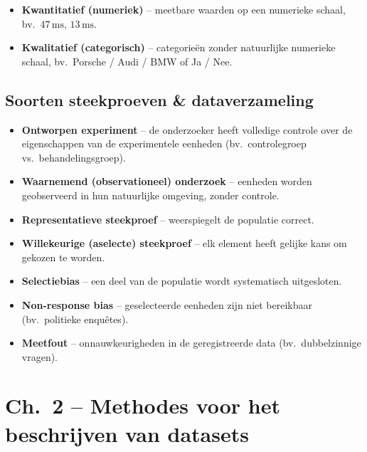 \documentclass[a4paper,11pt]{article}
\begin{document}
\begin{conceptbox}
\begin{itemize}
  \item \textbf{Kwantitatief (numeriek)} -- meetbare waarden op een numerieke schaal, bv.\ $47\,\text{ms}$, $13\,\text{ms}$.
  \item \textbf{Kwalitatief (categorisch)} -- categorieën zonder natuurlijke numerieke schaal, bv.\ Porsche / Audi / BMW of Ja / Nee.
\end{itemize}
\end{conceptbox}

\subsection{Soorten steekproeven \& dataverzameling}
\begin{itemize}
  \item \textbf{Ontworpen experiment} -- de onderzoeker heeft volledige controle over de eigenschappen van de experimentele eenheden (bv.\ controlegroep vs.\ behandelingsgroep).
  \item \textbf{Waarnemend (observationeel) onderzoek} -- eenheden worden geobserveerd in hun natuurlijke omgeving, zonder controle.
  \item \textbf{Representatieve steekproef} -- weerspiegelt de populatie correct.
  \item \textbf{Willekeurige (aselecte) steekproef} -- elk element heeft gelijke kans om gekozen te worden.
\end{itemize}

\begin{conceptbox}
\begin{itemize}
  \item \textbf{Selectiebias} -- een deel van de populatie wordt systematisch uitgesloten.
  \item \textbf{Non-response bias} -- geselecteerde eenheden zijn niet bereikbaar (bv.\ politieke enquêtes).
  \item \textbf{Meetfout} -- onnauwkeurigheden in de geregistreerde data (bv.\ dubbelzinnige vragen).
\end{itemize}
\end{conceptbox}

\newpage
\section{Ch.\ 2 -- Methodes voor het beschrijven van datasets}
\end{document}
